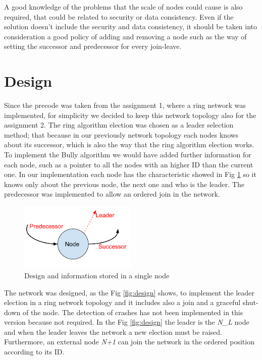 \documentclass[11pt,conference]{IEEEtran}
\begin{document}
A good knowledge of the problems that the scale of nodes could cause is also required, that could be related to security or data consistency. Even if the solution doesn't include the security and data consistency, it should be taken into consideration a good policy of adding and removing a node such as the way of setting the successor and predecessor for every join-leave.

\section{Design}
\label{chap:design}
Since the precode was taken from the assignment 1, where a ring network was implemented, for simplicity we decided to keep this network topology also for the assignment 2. The ring algorithm election was chosen as a leader selection method; that because in our previously network topology each nodes knows about its successor, which is also the way that the ring algorithm election works. To implement the Bully algorithm we would have added further information for each node, such as a pointer to all the nodes with an higher ID than the current one.
\newline
In our implementation each node has the characteristic showed in Fig \ref{fig:node} so it knows only about the previous node, the next one and who is the leader.
\newline
The predecessor was implemented to allow an ordered join in the network.
\begin{figure}[h!]
  \centering
    \includegraphics[width=0.5\textwidth]{node}
    \caption{Design and information stored in a single node}
    \label{fig:node}
\end{figure}

The network was designed, as the Fig \ref{fig:design} shows, to implement the leader election in a ring network topology and it includes also a join and a graceful shut-down of the node. The detection of crashes has not been implemented in this version because not required. In the Fig \ref{fig:design} the leader is the \textit{N\_L} node and when the leader leaves the network a new election must be raised. Furthermore, an external node \textit{N+1} can join the network in the ordered position according to its ID.
\end{document}
